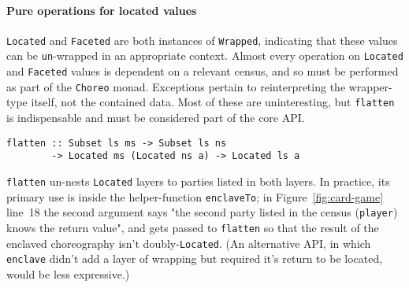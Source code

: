 \documentclass[sigplan,screen]{acmart}
\newcommand{\inlinecode}[2][haskell]{\texttt{#2}}
\begin{document}
\paragraph{Pure operations for located values}
\inlinecode{Located} and \inlinecode{Faceted} are both instances of \inlinecode{Wrapped},
indicating that these values can be \inlinecode{un}-wrapped in an appropriate context.
Almost every operation on \inlinecode{Located} and \inlinecode{Faceted} values is dependent
on a relevant census, and so must be performed as part of the \inlinecode{Choreo} monad.
Exceptions pertain to reinterpreting the wrapper-type itself, not the contained data.
Most of these are uninteresting,
but \inlinecode{flatten} is indispensable and must be considered part of the core API.
%
\begin{verbatim}
flatten :: Subset ls ms -> Subset ls ns
        -> Located ms (Located ns a) -> Located ls a
\end{verbatim}
%
\inlinecode{flatten} un-nests \inlinecode{Located} layers to parties listed in both layers.
In practice, its primary use is inside the helper-function \inlinecode{enclaveTo};
in Figure~\ref{fig:card-game} line~18 the second argument says
"the second party listed in the census (\inlinecode{player}) knows the return value",
and gets passed to \inlinecode{flatten} so that the result of the enclaved choreography
isn't doubly-\inlinecode{Located}.
(An alternative API, in which \inlinecode{enclave} didn't add a layer of wrapping but
required it's return to be located, would be less expressive.)
\end{document}
